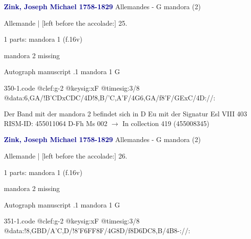 \documentclass[twocolumn]{book}
\begin{document}
\newline \par \vspace{7pt} \textcolor{darkblue}{\textbf{Zink, Joseph Michael  1758-1829}}
\newline Allemandes - G
\newline mandora (2)
\newline \begin{itshape}[f.16v, at left:] Allemande | [left before the accolade:] 25.\end{itshape} 
\newline \textcolor{darkblue}{}  1 parts: mandora 1  (f.16v)
\newline \begin{small} mandora 2 missing\end{small} 
\newline Autograph manuscript
.1  mandora 1  G  
\begin{filecontents*}{350-1.code}
@clef:g-2
@keysig:xF
@timesig:3/8
@data:{6,GA}/!{B'CD}{xCDC}/4D!8,B/'C,A'F/4G{6,GA}/f8'F/GExC/4D://:
\end{filecontents*}
\newline
%

\newline Der Band mit der mandora 2 befindet sich in D Eu mit der Signatur Esl VIII 403
\newline RISM-ID: 455011064
\newline D-Fh  Ms 002
\newline $\rightarrow$ In collection 419 (455008345)
      
\newline \par \vspace{7pt} \textcolor{darkblue}{\textbf{Zink, Joseph Michael  1758-1829}}
\newline Allemandes - G
\newline mandora (2)
\newline \begin{itshape}[f.16v, at left:] Allemande | [left before the accolade:] 26.\end{itshape} 
\newline \textcolor{darkblue}{}  1 parts: mandora 1  (f.16v)
\newline \begin{small} mandora 2 missing\end{small} 
\newline Autograph manuscript
.1  mandora 1  G  
\begin{filecontents*}{351-1.code}
@clef:g-2
@keysig:xF
@timesig:3/8
@data:!8,GBD/A'C,D/!{8'F6FF8F}/4G8D/f{8D6DC8,B}/4B8-://:
\end{filecontents*}
\newline
%
\end{document}
